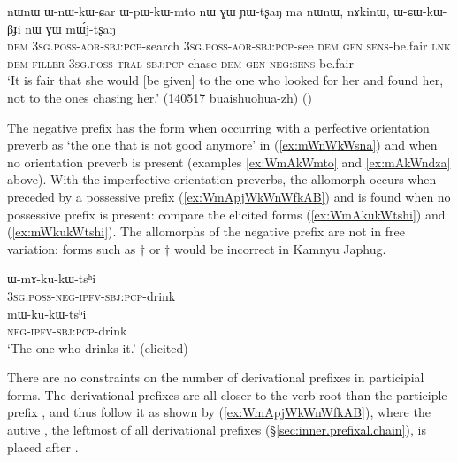  \begin{exe} 
\ex \label{ex:WnWkWCar}
\gll nɯnɯ ɯ-nɯ-kɯ-ɕar ɯ-pɯ-kɯ-mto nɯ ɣɯ ɲɯ-tʂaŋ ma nɯnɯ, nɤkinɯ, ɯ-ɕɯ-kɯ-βɟi nɯ ɣɯ mɯ́j-tʂaŋ \\
\textsc{dem} \textsc{3sg}.\textsc{poss}-\textsc{aor}-\textsc{sbj}:\textsc{pcp}-search \textsc{3sg}.\textsc{poss}-\textsc{aor}-\textsc{sbj}:\textsc{pcp}-see \textsc{dem} \textsc{gen} \textsc{sens}-be.fair \textsc{lnk} \textsc{dem} \textsc{filler} \textsc{3sg}.\textsc{poss}-\textsc{tral}-\textsc{sbj}:\textsc{pcp}-chase \textsc{dem} \textsc{gen} \textsc{neg}:\textsc{sens}-be.fair \\
\glt `It is fair that she would [be given] to the one who looked for her and found her, not to the ones chasing her.' (140517 buaishuohua-zh)
()
\end{exe}

The negative prefix has the form  when occurring with a perfective orientation preverb as  `the one that is not good anymore' in (\ref{ex:mWnWkWsna}) and  when no orientation preverb is present (examples \ref{ex:WmAkWmto} and \ref{ex:mAkWndza} above). With the imperfective orientation preverbs, the allomorph  occurs when preceded by a possessive prefix (\ref{ex:WmApjWkWnWfkAB}) and  is found when no possessive prefix is present: compare the elicited forms (\ref{ex:WmAkukWtshi}) and (\ref{ex:mWkukWtshi}). The allomorphs of the negative prefix are not in free variation: forms such as $\dagger$ or $\dagger$ would be incorrect in Kamnyu Japhug.

 \begin{exe} 
\ex \label{ex:WmAkukWtshi}
\gll ɯ-mɤ-ku-kɯ-tsʰi \\
\textsc{3sg}.\textsc{poss}-\textsc{neg}-\textsc{ipfv}-\textsc{sbj}:\textsc{pcp}-drink \\
\ex \label{ex:mWkukWtshi}
\gll mɯ-ku-kɯ-tsʰi \\
\textsc{neg}-\textsc{ipfv}-\textsc{sbj}:\textsc{pcp}-drink \\
\glt  `The one who drinks it.' (elicited)
\end{exe}

There are no constraints on the number of derivational prefixes in participial forms. The derivational prefixes are all closer to the verb root than the participle prefix , and thus follow it as shown by (\ref{ex:WmApjWkWnWfkAB}), where the autive , the leftmost of all derivational prefixes (§\ref{sec:inner.prefixal.chain}), is placed after . 


